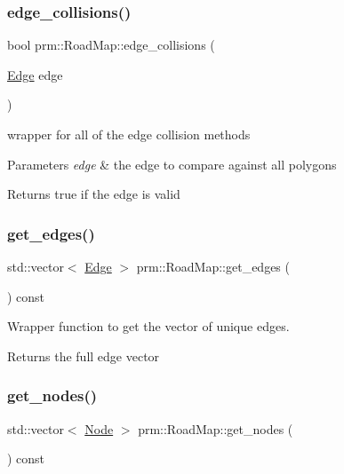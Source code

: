 \subsubsection{\texorpdfstring{edge\+\_\+collisions()}{edge\_collisions()}}
{\footnotesize\ttfamily bool prm\+::\+Road\+Map\+::edge\+\_\+collisions (\begin{DoxyParamCaption}\item[{\hyperlink{structprm_1_1Edge}{Edge}}]{edge }\end{DoxyParamCaption})\hspace{0.3cm}{\ttfamily [private]}}



wrapper for all of the edge collision methods 


\begin{DoxyParams}{Parameters}
{\em edge} & the edge to compare against all polygons \\
\hline
\end{DoxyParams}
\begin{DoxyReturn}{Returns}
true if the edge is valid 
\end{DoxyReturn}
\mbox{\label{classprm_1_1RoadMap_a9be7cb5cac090269e00125cc7dc0cfd6}} 
\subsubsection{\texorpdfstring{get\+\_\+edges()}{get\_edges()}}
{\footnotesize\ttfamily std\+::vector$<$ \hyperlink{structprm_1_1Edge}{Edge} $>$ prm\+::\+Road\+Map\+::get\+\_\+edges (\begin{DoxyParamCaption}{ }\end{DoxyParamCaption}) const}



Wrapper function to get the vector of unique edges. 

\begin{DoxyReturn}{Returns}
the full edge vector 
\end{DoxyReturn}
\mbox{\label{classprm_1_1RoadMap_a9b8c5b9de9a678f1eb9a6ceaa9fd8bb0}} 
\subsubsection{\texorpdfstring{get\+\_\+nodes()}{get\_nodes()}}
{\footnotesize\ttfamily std\+::vector$<$ \hyperlink{structprm_1_1Node}{Node} $>$ prm\+::\+Road\+Map\+::get\+\_\+nodes (\begin{DoxyParamCaption}{ }\end{DoxyParamCaption}) const}



